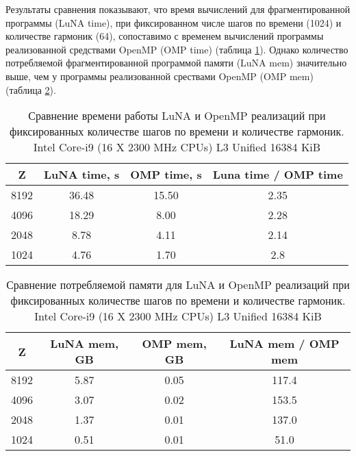 Результаты сравнения показывают, что время вычислений для фрагментированной программы (LuNA time),
при фиксированном числе шагов по времени (1024) и количестве гармоник (64),
сопоставимо с временем вычислений программы реализованной средствами OpenMP (OMP time) (таблица \ref{table2}).
Однако количество потребляемой фрагментированной программой памяти (LuNA mem) значительно выше,
чем у программы реализованной срествами OpenMP (OMP mem) (таблица \ref{table3}).
\begin{center}
\begin{table}[h!]
\centering
  \begin{tabular}{|c|c|c|c|}
   \hline
	\textbf{Z} & \textbf{LuNA time, s} &  \textbf{OMP time, s} & \textbf{Luna time / OMP time} \\
	\hline
	8192 & 36.48 & 15.50 & 2.35 \\
	\hline
	4096 & 18.29 & 8.00 & 2.28 \\
	\hline
	2048 & 8.78 & 4.11 & 2.14 \\
	\hline
	1024 & 4.76 & 1.70 & 2.8 \\
  \hline 
  \end{tabular}
  \captionsetup{justification=centering}
  \caption{Сравнение времени работы LuNA и OpenMP реализаций при фиксированных количестве шагов по времени и количестве гармоник. Intel Core-i9 (16 X 2300 MHz CPUs) L3 Unified 16384 KiB}\label{table2}
\end{table}
\end{center}
\begin{center}
\begin{table}[h!]
\centering
  \begin{tabular}{|c|c|c|c|}
   \hline
	\textbf{Z} & \textbf{LuNA mem, GB} & \textbf{OMP mem, GB}  & \textbf{LuNA mem / OMP mem} \\
	\hline
	8192 & 5.87 & 0.05 & 117.4 \\
	\hline
	4096 & 3.07 & 0.02 & 153.5 \\
	\hline
	2048 & 1.37 & 0.01 & 137.0 \\
	\hline
	1024 & 0.51 & 0.01 & 51.0 \\
  \hline 
  \end{tabular}
  \captionsetup{justification=centering}
  \caption{Сравнение потребляемой памяти для LuNA и OpenMP реализаций при фиксированных количестве шагов по времени и количестве гармоник. Intel Core-i9 (16 X 2300 MHz CPUs) L3 Unified 16384 KiB}\label{table3}
\end{table}
\end{center}

